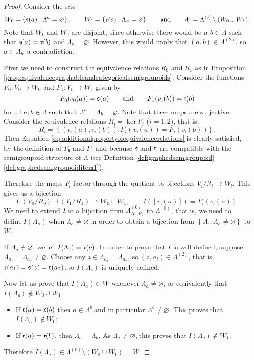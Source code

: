 \begin{proof}
Consider the sets \[W_0=\left\{\operatorname{\mathfrak{s}}(a):\Lambda^a=\varnothing\right\},\qquad W_1=\left\{\operatorname{\mathfrak{r}}(a):\Lambda_a=\varnothing\right\}\qquad\text{and}\qquad W=\Lambda^{(0)}\setminus(W_0\cup W_1).\]
Note that $W_0$ and $W_1$ are disjoint, since otherwise there would be $a,b\in\Lambda$ such that $\operatorname{\mathfrak{s}}(a)=\operatorname{\mathfrak{r}}(b)$ and $\Lambda_b=\varnothing$. However, this would imply that $(a,b)\in\Lambda^{(2)}$, so $a\in\Lambda_b$, a contradiction.

First we need to construct the equivalence relations $R_0$ and $R_1$ as in Proposition \ref{prop:equivalencegraphableandcategoricalsemigroupoids}. Consider the functions $F_0\colon V_0\to W_0$ and $F_1\colon V_1\to W_1$ given by
\[F_0(v_0(a))=\operatorname{\mathfrak{s}}(a)\qquad\text{and}\qquad F_1(v_1(b))=\operatorname{\mathfrak{r}}(b)\]
for all $a,b\in\Lambda$ such that $\Lambda^a=\Lambda_b=\varnothing$. Note that these maps are surjective. Consider the equivalence relations $R_i=\ker F_i$ ($i=1,2$), that is,
\[R_i=\left\{(v_i(a),v_i(b)):F_i(v_i(a))=F_i(v_i(b))\right\}.\]
Then Equation \eqref{eq:additionalpropertyofequivalencerelations} is clearly satisfied, by the definition of $F_0$ and $F_1$ and because $\operatorname{\mathfrak{s}}$ and $\operatorname{\mathfrak{r}}$ are compatible with the semigroupoid structure of $\Lambda$ (see Definition \ref{def:graphedsemigroupoid}\ref{def:graphedsemigroupoiditem1}).

Therefore the maps $F_i$ factor through the quotient to bijections $V_i/R_i\to W_i$. This gives us a bijection
\[I\colon(V_0/R_0)\sqcup(V_1/R_1)\to W_0\cup W_1,\qquad I([v_i(a)])=F_i(v_i(a)).\]
We need to extend $I$ to a bijection from $\Lambda_{R_0,R_1}^{(0)}$ to $\Lambda^{(0)}$, that is, we need to define $I(\Lambda_a)$ when $\Lambda_a\neq\varnothing$ in order to obtain a bijection from $\left\{\Lambda_a:\Lambda_a\neq\varnothing\right\}$ to $W$.

If $\Lambda_a\neq\varnothing$, we let $I(\Lambda_a)=\operatorname{\mathfrak{r}}(a)$. In order to prove that $I$ is well-defined, suppose $\Lambda_{a_1}=\Lambda_{a_2}\neq\varnothing$. Choose any $z\in\Lambda_{a_1}=\Lambda_{a_2}$, so $(z,a_i)\in\Lambda^{(2)}$, that is, $\operatorname{\mathfrak{r}}(a_1)=\operatorname{\mathfrak{s}}(z)=\operatorname{\mathfrak{r}}(a_2)$, so $I(\Lambda_a)$ is uniquely defined.

Now let us prove that $I(\Lambda_a)\in W$ whenever $\Lambda_a\neq\varnothing$, or equivalently that $I(\Lambda_a)\not\in W_0\cup W_1$.
\begin{itemize}
    \item If $\operatorname{\mathfrak{r}}(a)=\operatorname{\mathfrak{s}}(b)$ then $a\in\Lambda^b$ and in particular $\Lambda^b\neq\varnothing$. This proves that $I(\Lambda_a)\not\in W_0$;
    \item If $\operatorname{\mathfrak{r}}(a)=\operatorname{\mathfrak{r}}(b)$, then $\Lambda_a=\Lambda_b$. As $\Lambda_a\neq\varnothing$, this proves that $I(\Lambda_a)\not\in W_1$.
\end{itemize}
Therefore $I(\Lambda_a)\in\Lambda^{(0)}\setminus(W_0\cup W_1)=W$.


\end{proof}
